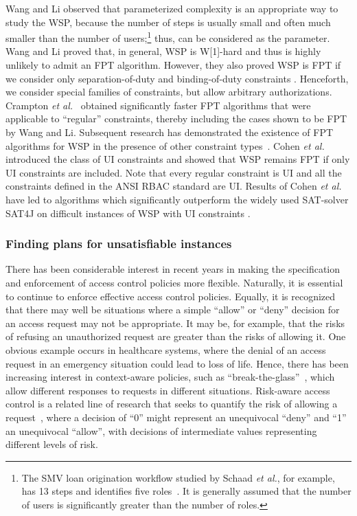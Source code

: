 \documentclass[jcs,crcready]{iosart1c}
\newcommand{\etal}{\textit{et al.}\xspace}
\begin{document}
Wang and Li observed that parameterized complexity is an appropriate way to study the WSP, because the number  of steps is usually small and often much smaller than the number  of users;\footnote{The SMV loan origination workflow studied by Schaad \etal, for example, has 13 steps and identifies five roles~\cite{ScLoSo06}. It is generally assumed that the number of users is significantly greater than the number of roles.} thus,  can be considered as the parameter. 
Wang and Li \cite{WaLi10}  proved that, in general, WSP is W[1]-hard and thus is highly unlikely to admit an FPT algorithm.
However, they also proved WSP is FPT if we consider only separation-of-duty and binding-of-duty constraints \cite{WaLi10}. Henceforth, we consider special families of constraints, but allow arbitrary authorizations.
Crampton \etal~\cite{CrGuYe13} obtained significantly faster FPT algorithms that were applicable to ``regular'' constraints, thereby including the cases shown to be FPT by Wang and Li.
Subsequent research has demonstrated the existence of FPT algorithms for {\sc WSP} in the presence of other constraint types~\cite{CrCrGuJoRa13,CrGu13}. Cohen \etal~\cite{CoCrGaGuJo14}
introduced the class of UI constraints and showed that WSP remains FPT if only UI constraints are included. Note that every regular constraint is UI and all the constraints defined in the ANSI RBAC standard \cite{ansi-rbac04} are UI. Results of Cohen \etal~\cite{CoCrGaGuJo14}  have led to algorithms which significantly outperform the widely used SAT-solver SAT4J on difficult instances of WSP with UI constraints \cite{CoCrGaGuJo14c,KaGaGu}.


 
\subsubsection{Finding plans for unsatisfiable instances}
 


There has been considerable interest in recent years in making the specification and enforcement of access control policies more flexible.
Naturally, it is essential to continue to enforce effective access control policies.
Equally, it is recognized that there may well be situations where a simple ``allow'' or ``deny'' decision for an access request may not be appropriate.
It may be, for example, that the risks of refusing an unauthorized request are greater than the risks of allowing it.
One obvious example occurs in healthcare systems, where the denial of an access request in an emergency situation could lead to loss of life.
Hence, there has been increasing interest in context-aware policies, such as ``break-the-glass''~\cite{BrPe09}, which allow different responses to requests in different situations.
Risk-aware access control is a related line of research that seeks to quantify the risk of allowing a request~\cite{DiBeEyBaMo04}, where a decision of ``0'' might represent an unequivocal ``deny'' and ``1'' an unequivocal ``allow'', with decisions of intermediate values representing different levels of risk.
\end{document}
